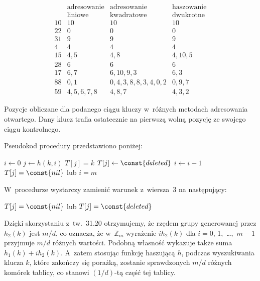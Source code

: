 \begin{table}[ht]
	\begin{center}
		\[
			\begin{array}{c|c|c|c}
				& \text{adresowanie} & \text{adresowanie} & \text{haszowanie} \\
				& \text{liniowe} & \text{kwadratowe} & \text{dwukrotne} \\
				\hline
				10 & 10 & 10 & 10 \\
				\hline
				22 & 0 & 0 & 0 \\
				\hline
				31 & 9 & 9 & 9 \\
				\hline
				4 & 4 & 4 & 4 \\
				\hline
				15 & 4,5 & 4,8 & 4,10,5 \\
				\hline
				28 & 6 & 6 & 6 \\
				\hline
				17 & 6,7 & 6,10,9,3 & 6,3 \\
				\hline
				88 & 0,1 & 0,4,3,8,8,3,4,0,2 & 0,9,7 \\
				\hline
				59 & 4,5,6,7,8 & 4,8,7 & 4,3,2
			\end{array}
		\]
	\end{center}
	\caption{Pozycje obliczane dla podanego ciągu kluczy w~różnych metodach adresowania otwartego.
Dany klucz trafia ostatecznie na pierwszą wolną pozycję ze swojego ciągu kontrolnego.} \label{tab:11-1}
\end{table}

\exercise %
Pseudokod procedury  przedstawiono poniżej:
\begin{codebox}
\li	$i\gets0$
\li	\Repeat
		$j\gets h(k,i)$
\li		\If $T[j]=k$
\li			\Then
				$T[j]\gets\const{deleted}$
\li				\Return
			\End
\li		$i\gets i+1$
\li	\Until $T[j]=\const{nil}$ lub $i=m$
\end{codebox}
W~procedurze  wystarczy zamienić warunek z~wiersza~3 na następujący:
\begin{codebox}
\setcounter{codelinenumber}{2}
\li	\If $T[j]=\const{nil}$ lub $T[j]=\const{deleted}$
\end{codebox}

\exercise %
Dzięki skorzystaniu z~tw.~31.20 otrzymujemy, że rzędem grupy generowanej przez $h_2(k)$ jest $m/d$, co oznacza, że w~$\mathbb{Z}_m$ wyrażenie $ih_2(k)$ dla $i=0$, 1,~\dots,~$m-1$ przyjmuje $m/d$ różnych wartości.
Podobną własność wykazuje także suma $h_1(k)+ih_2(k)$.
A~zatem stosując funkcję haszującą $h$, podczas wyszukiwania klucza $k$, które zakończy się porażką, zostanie sprawdzonych $m/d$ różnych komórek tablicy, co stanowi $(1/d)$-tą część tej tablicy.

